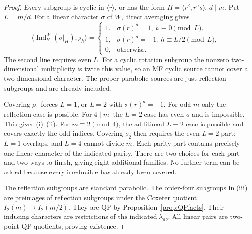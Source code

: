 \documentclass[11pt]{article}
\numberwithin{equation}{section}
\theoremstyle{definition}
\DeclareMathOperator{\Ind}{Ind}
\begin{document}
\begin{proof}
Every subgroup is cyclic in \(\langle r\rangle\), or has the form
\(H=\langle r^d,r^as\rangle\), \(d\mid m\).
Put \(L=m/d\).
For a linear character \(\sigma\) of \(W\), direct averaging gives
\[
 \langle\Ind_H^W(\sigma|_H),\rho_h\rangle=
 \begin{cases}
 1,&\sigma(r)^d=1,\ h\equiv0\pmod L,\\
 1,&\sigma(r)^d=-1,\ h\equiv L/2\pmod L,\\
 0,&\text{otherwise}.
 \end{cases}
\]
The second line requires even \(L\).
For a cyclic rotation subgroup the nonzero two-dimensional multiplicity is twice this value, so an MF cyclic source cannot cover a two-dimensional character.
The proper-parabolic sources are just reflection subgroups and are already included.

Covering \(\rho_1\) forces \(L=1\), or \(L=2\) with \(\sigma(r)^d=-1\).
For odd \(m\) only the reflection case is possible.
For \(4\mid m\), the \(L=2\) case has even \(d\) and is impossible.
This gives (i)--(ii).
For \(m\equiv2\pmod4\), the additional \(L=2\) case is possible and covers exactly the odd indices.
Covering \(\rho_2\) then requires the even \(L=2\) part: \(L=1\) overlaps, and \(L=4\) cannot divide \(m\).
Each parity part contains precisely one linear character of the indicated parity.
There are two choices for each part and two ways to finish, giving eight additional families.
No further term can be added because every irreducible has already been covered.

The reflection subgroups are standard parabolic.
The order-four subgroups in (iii) are preimages of reflection subgroups under the Coxeter quotient
\(I_2(m)\to I_2(m/2)\).
They are QP by Proposition~\ref{prop:QPfacts}.
Their inducing characters are restrictions of the indicated \(\lambda_{ab}\).
All linear pairs are two-point QP quotients, proving existence.
\end{proof}
\end{document}
